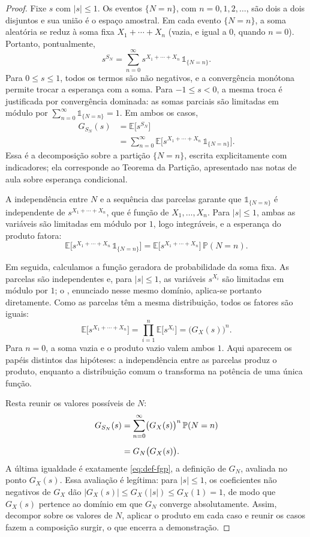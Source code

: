 \documentclass[12pt,portuguese]{article}
\theoremstyle{definition}
\theoremstyle{plainexercise}
\theoremstyle{starredexercise}
\theoremstyle{definition}
\begin{document}
\begin{proof}
Fixe $s$ com $|s|\leqslant 1$. Os eventos $\{N=n\}$, com
$n=0,1,2,\ldots$, são dois a dois disjuntos e sua união é o espaço
amostral. Em cada evento $\{N=n\}$, a soma aleatória se reduz à soma fixa
$X_1+\cdots+X_n$ (vazia, e igual a $0$, quando $n=0$). Portanto,
pontualmente,
\[
s^{S_N}
=\sum_{n=0}^{\infty}s^{X_1+\cdots+X_n}\,\mathds{1}_{\{N=n\}}.
\]
Para $0\leqslant s\leqslant 1$, todos os termos são não negativos, e a
convergência monótona permite trocar a esperança com a soma. Para
$-1\leqslant s<0$, a mesma troca é justificada por convergência dominada:
as somas parciais são limitadas em módulo por
$\sum_{n=0}^{\infty}\mathds{1}_{\{N=n\}}=1$. Em ambos os casos,
\begin{align*}
G_{S_N}(s)
&=\mathbb{E}\bigl[s^{S_N}\bigr]
\\[0.2cm]
&=\sum_{n=0}^{\infty}
\mathbb{E}\bigl[s^{X_1+\cdots+X_n}\,\mathds{1}_{\{N=n\}}\bigr].
\end{align*}
Essa é a decomposição sobre a partição $\{N=n\}$, escrita explicitamente
com indicadores; ela corresponde ao Teorema da Partição, apresentado nas
notas de aula sobre esperança condicional.

A independência entre $N$ e a sequência das parcelas garante que
$\mathds{1}_{\{N=n\}}$ é independente de $s^{X_1+\cdots+X_n}$, que é
função de $X_1,\ldots,X_n$. Para $|s|\leqslant 1$, ambas as
variáveis são limitadas em módulo por $1$, logo integráveis, e a esperança
do produto fatora:
\[
\mathbb{E}\bigl[s^{X_1+\cdots+X_n}\,\mathds{1}_{\{N=n\}}\bigr]
=\mathbb{E}\bigl[s^{X_1+\cdots+X_n}\bigr]\,\mathbb{P}(N=n).
\]

Em seguida, calculamos a função geradora de probabilidade da soma fixa. As
parcelas são independentes e, para $|s|\leqslant 1$, as variáveis $s^{X_i}$ são
limitadas
em módulo por $1$; o , enunciado nesse mesmo
domínio, aplica-se portanto diretamente. Como as parcelas têm a mesma
distribuição, todos os fatores são iguais:
\[
\mathbb{E}\bigl[s^{X_1+\cdots+X_n}\bigr]
=\prod_{i=1}^{n}\mathbb{E}\bigl[s^{X_i}\bigr]
=\bigl(G_X(s)\bigr)^n.
\]
Para $n=0$, a soma vazia e o produto vazio valem ambos $1$. Aqui aparecem
os papéis distintos das hipóteses: a independência entre as parcelas
produz o produto, enquanto a distribuição comum o transforma na potência
de uma única função.

Resta reunir os valores possíveis de $N$:
\begin{align}
G_{S_N}(s)
&=\sum_{n=0}^{\infty}\bigl(G_X(s)\bigr)^n\,\mathbb{P}(N=n)
\label{eq:fgp-soma-aleatoria-casos}
\\[0.2cm]
&=G_N\bigl(G_X(s)\bigr).\notag
\end{align}
A última igualdade é exatamente \eqref{eq:def-fgp}, a definição de $G_N$,
avaliada no ponto $G_X(s)$. Essa avaliação é legítima: para
$|s|\leqslant 1$, os coeficientes não negativos de $G_X$ dão
$|G_X(s)|\leqslant G_X(|s|)\leqslant G_X(1)=1$, de modo que $G_X(s)$
pertence ao domínio em que $G_N$ converge absolutamente. Assim, decompor sobre os
valores de $N$, aplicar o produto em cada caso e reunir os casos fazem a
composição surgir, o que encerra a demonstração.
\end{proof}
\end{document}
